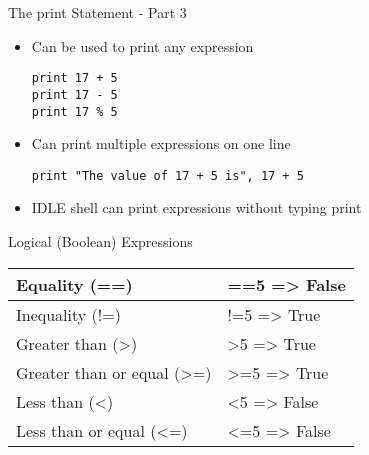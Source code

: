 \begin{frame}[fragile]{The {\ttfamily print} Statement - Part 3}
  \begin{itemize}
    \item Can be used to print any expression
\begin{lstlisting}
print 17 + 5
print 17 - 5
print 17 % 5
\end{lstlisting}
\item Can print multiple expressions on one line
\begin{lstlisting}
print "The value of 17 + 5 is", 17 + 5
\end{lstlisting}
\item IDLE shell can print expressions without typing {\ttfamily print}
  \end{itemize}
\end{frame}

\begin{frame}{Logical (Boolean) Expressions}
  \begin{center}
  \begin{tabular}{|ll|}\hline
    Equality ({\ttfamily ==}) & {\ttfamily 17==5} => {\ttfamily False} \\\hline
    Inequality ({\ttfamily !=}) & {\ttfamily 17!=5} => {\ttfamily True}\\\hline
    Greater than ({\ttfamily >}) & {\ttfamily 17>5} => {\ttfamily True}\\\hline
    Greater than or equal ({\ttfamily >=}) & {\ttfamily 17>=5} => {\ttfamily True}\\\hline
    Less than ({\ttfamily <}) & {\ttfamily 17<5} => {\ttfamily False}\\\hline
    Less than or equal ({\ttfamily <=}) & {\ttfamily 17<=5} => {\ttfamily False}\\\hline
  \end{tabular}
\end{center}
\end{frame}



